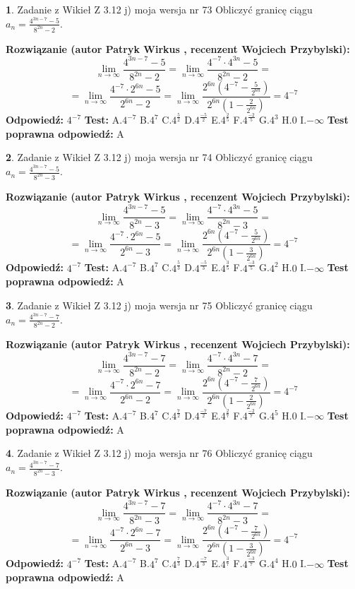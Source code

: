 \documentclass[12pt, a4paper]{article}
\theoremstyle{definition} %
\newtheorem{zad}{}
\newcommand{\zadStart}[1]{\begin{zad}#1\newline}
\newcommand{\zadStop}{\end{zad}}
\newcommand{\rozwStart}[2]{\noindent \textbf{Rozwiązanie (autor #1 , recenzent #2): }\newline}
\newcommand{\rozwStop}{\newline}
\newcommand{\odpStart}{\noindent \textbf{Odpowiedź:}\newline}
\newcommand{\odpStop}{\newline}
\newcommand{\testStart}{\noindent \textbf{Test:}\newline}
\newcommand{\testStop}{\newline}
\newcommand{\kluczStart}{\noindent \textbf{Test poprawna odpowiedź:}\newline}
\newcommand{\kluczStop}{\newline}
\begin{document}
\zadStart{Zadanie z Wikieł Z 3.12 j) moja wersja nr 73}
Obliczyć granicę ciągu $a_{n}=\frac{4^{3n-7}-5}{8^{2n}-2}$.
\zadStop
\rozwStart{Patryk Wirkus}{Wojciech Przybylski}
$$\lim\limits_{n\to\infty}\frac{4^{3n-7}-5}{8^{2n}-2}= \lim\limits_{n\to\infty}\frac{4^{-7} \cdot 4^{3n}-5}{8^{2n}-2}=$$
$$= \lim\limits_{n\to\infty}\frac{4^{-7} \cdot 2^{6n}-5}{2^{6n}-2}= \lim\limits_{n\to\infty}\frac{2^{6n}(4^{-7} - \frac{5}{2^{6n}})}{2^{6n}(1-\frac{2}{2^{6n}})}= 4^{-7}$$
\rozwStop
\odpStart
$4^{-7}$
\odpStop
\testStart
A.$4^{-7}$
B.$4^{7}$
C.$4^{\frac{5}{2}}$
D.$4^{\frac{-5}{2}}$
E.$4^{\frac{2}{5}}$
F.$4^{\frac{-2}{5}}$
G.$4^{3}$
H.$0$
I.$-\infty$
\testStop
\kluczStart
A
\kluczStop



\zadStart{Zadanie z Wikieł Z 3.12 j) moja wersja nr 74}
Obliczyć granicę ciągu $a_{n}=\frac{4^{3n-7}-5}{8^{2n}-3}$.
\zadStop
\rozwStart{Patryk Wirkus}{Wojciech Przybylski}
$$\lim\limits_{n\to\infty}\frac{4^{3n-7}-5}{8^{2n}-3}= \lim\limits_{n\to\infty}\frac{4^{-7} \cdot 4^{3n}-5}{8^{2n}-3}=$$
$$= \lim\limits_{n\to\infty}\frac{4^{-7} \cdot 2^{6n}-5}{2^{6n}-3}= \lim\limits_{n\to\infty}\frac{2^{6n}(4^{-7} - \frac{5}{2^{6n}})}{2^{6n}(1-\frac{3}{2^{6n}})}= 4^{-7}$$
\rozwStop
\odpStart
$4^{-7}$
\odpStop
\testStart
A.$4^{-7}$
B.$4^{7}$
C.$4^{\frac{5}{3}}$
D.$4^{\frac{-5}{3}}$
E.$4^{\frac{3}{5}}$
F.$4^{\frac{-3}{5}}$
G.$4^{2}$
H.$0$
I.$-\infty$
\testStop
\kluczStart
A
\kluczStop



\zadStart{Zadanie z Wikieł Z 3.12 j) moja wersja nr 75}
Obliczyć granicę ciągu $a_{n}=\frac{4^{3n-7}-7}{8^{2n}-2}$.
\zadStop
\rozwStart{Patryk Wirkus}{Wojciech Przybylski}
$$\lim\limits_{n\to\infty}\frac{4^{3n-7}-7}{8^{2n}-2}= \lim\limits_{n\to\infty}\frac{4^{-7} \cdot 4^{3n}-7}{8^{2n}-2}=$$
$$= \lim\limits_{n\to\infty}\frac{4^{-7} \cdot 2^{6n}-7}{2^{6n}-2}= \lim\limits_{n\to\infty}\frac{2^{6n}(4^{-7} - \frac{7}{2^{6n}})}{2^{6n}(1-\frac{2}{2^{6n}})}= 4^{-7}$$
\rozwStop
\odpStart
$4^{-7}$
\odpStop
\testStart
A.$4^{-7}$
B.$4^{7}$
C.$4^{\frac{7}{2}}$
D.$4^{\frac{-7}{2}}$
E.$4^{\frac{2}{7}}$
F.$4^{\frac{-2}{7}}$
G.$4^{5}$
H.$0$
I.$-\infty$
\testStop
\kluczStart
A
\kluczStop



\zadStart{Zadanie z Wikieł Z 3.12 j) moja wersja nr 76}
Obliczyć granicę ciągu $a_{n}=\frac{4^{3n-7}-7}{8^{2n}-3}$.
\zadStop
\rozwStart{Patryk Wirkus}{Wojciech Przybylski}
$$\lim\limits_{n\to\infty}\frac{4^{3n-7}-7}{8^{2n}-3}= \lim\limits_{n\to\infty}\frac{4^{-7} \cdot 4^{3n}-7}{8^{2n}-3}=$$
$$= \lim\limits_{n\to\infty}\frac{4^{-7} \cdot 2^{6n}-7}{2^{6n}-3}= \lim\limits_{n\to\infty}\frac{2^{6n}(4^{-7} - \frac{7}{2^{6n}})}{2^{6n}(1-\frac{3}{2^{6n}})}= 4^{-7}$$
\rozwStop
\odpStart
$4^{-7}$
\odpStop
\testStart
A.$4^{-7}$
B.$4^{7}$
C.$4^{\frac{7}{3}}$
D.$4^{\frac{-7}{3}}$
E.$4^{\frac{3}{7}}$
F.$4^{\frac{-3}{7}}$
G.$4^{4}$
H.$0$
I.$-\infty$
\testStop
\kluczStart
A
\kluczStop
\end{document}
